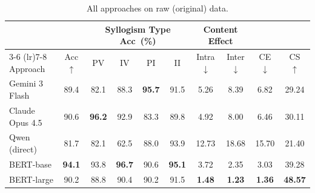 \begin{table}[t]
  \centering
  \caption{All approaches on raw (original) data.}
  \label{tab:comprehensive_raw}
  \begin{tabular}{l ccccc cc cc}
    \toprule
    & & \multicolumn{4}{c}{Syllogism Type Acc~(\%)} & \multicolumn{2}{c}{Content Effect} & & \\
    \cmidrule(lr){3-6} \cmidrule(lr){7-8}
    Approach & Acc $\uparrow$ & PV & IV & PI & II & Intra $\downarrow$ & Inter $\downarrow$ & CE $\downarrow$ & CS $\uparrow$ \\
    \midrule
    Gemini 3 Flash & 89.4 & 82.1 & 88.3 & \textbf{95.7} & 91.5 & 5.26 & 8.39 & 6.82 & 29.24 \\
    Claude Opus 4.5 & 90.6 & \textbf{96.2} & 92.9 & 83.3 & 89.8 & 4.92 & 8.00 & 6.46 & 30.11 \\
    Qwen (direct) & 81.7 & 82.1 & 62.5 & 88.0 & 93.9 & 12.73 & 18.68 & 15.70 & 21.40 \\
    \midrule
    BERT-base & \textbf{94.1} & 93.8 & \textbf{96.7} & 90.6 & \textbf{95.1} & 3.72 & 2.35 & 3.03 & 39.28 \\
    BERT-large & 90.2 & 88.8 & 90.4 & 90.2 & 91.5 & \textbf{1.48} & \textbf{1.23} & \textbf{1.36} & \textbf{48.57} \\
    \bottomrule
  \end{tabular}
\end{table}
